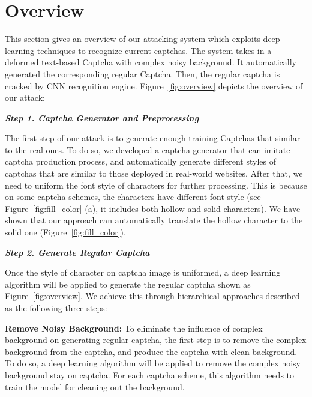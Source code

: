 \section{Overview}

This section gives an overview of our attacking system which exploits deep learning techniques to recognize current captchas. The system takes in a deformed text-based Captcha with complex noisy background. It automatically generated the corresponding regular Captcha. Then, the regular captcha is cracked by CNN recognition engine. Figure~\ref{fig:overview} depicts the overview of our attack:

\noindent \textbf{\emph{Step 1. Captcha Generator and Preprocessing}}

The first step of our attack is to generate enough training Captchas that similar to the real ones. To do so, we developed a captcha generator that can imitate captcha production process, and automatically generate different styles of captchas that are similar to those deployed in real-world websites. After that, we need to uniform the font style of characters for further processing. This is because on some captcha schemes, the characters have different font style (see Figure~\ref{fig:fill_color} (a), it includes both hollow and solid characters). We have shown that our approach can automatically translate the hollow character to the solid one (Figure~\ref{fig:fill_color}).


\noindent \textbf{\emph{Step 2. Generate Regular Captcha}}

Once the style of character on captcha image is uniformed, a deep learning algorithm will be applied to generate the regular captcha shown as Figure~\ref{fig:overview}. We achieve this through hierarchical approaches described as the following three steps:

\noindent \circling{\textcolor{white}{1}} \textbf{Remove Noisy Background:}  To eliminate the influence of complex background on generating regular captcha, the first step is to remove the complex background from the captcha, and produce the captcha with clean background.
To do so, a deep learning algorithm will be applied to remove the complex noisy background stay on captcha.
For each captcha scheme, this algorithm needs to train the model for cleaning out the background.

